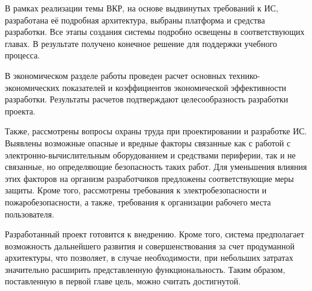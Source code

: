 \documentclass[utf8,usehyperref,12pt]{G7-32}
\begin{document}
В рамках реализации темы ВКР, на основе выдвинутых требований к ИС, разработана её подробная архитектура, выбраны платформа и средства разработки. Все этапы создания системы подробно освещены в соответствующих главах. В результате получено конечное решение для поддержки учебного процесса.

В экономическом разделе работы проведен расчет основных технико-экономических показателей и коэффициентов экономической эффективности разработки. Результаты расчетов подтверждают целесообразность разработки проекта.

Также, рассмотрены вопросы охраны труда при проектировании и разработке ИС. Выявлены возможные опасные и вредные факторы связанные как с работой с электронно-вычислительным оборудованием и средствами периферии, так и не связанные, но определяющие безопасность таких работ. Для уменьшения влияния этих факторов на организм разработчиков предложены соответствующие меры защиты. Кроме того, рассмотрены требования к  электробезопасности и пожаробезопасности, а также,  требования к организации рабочего места пользователя.

Разработанный проект готовится к внедрению. Кроме того, система предполагает возможность дальнейшего развития и совершенствования за счет продуманной архитектуры, что позволяет, в случае необходимости, при небольших затратах значительно расширить представленную функциональность. Таким образом, поставленную в первой главе цель, можно считать достигнутой.



\end{document}
